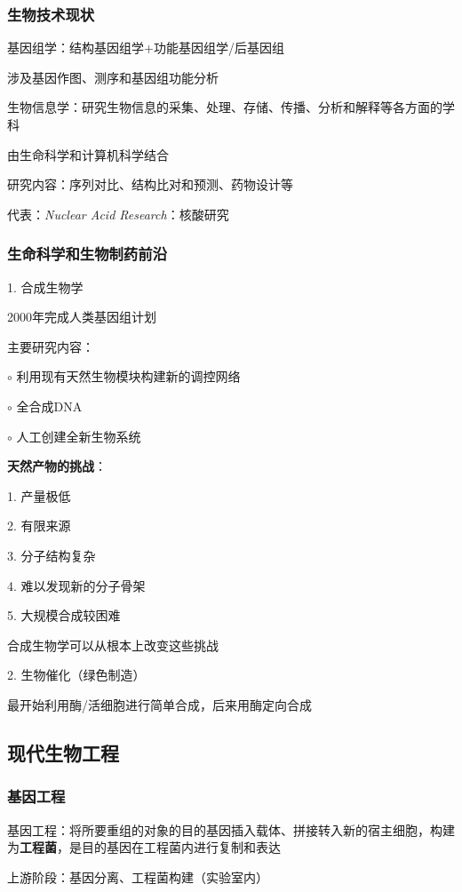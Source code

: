 \subsubsection*{生物技术现状}%
\label{subsub:生物技术现状}
\begin{notation}
    基因组学：结构基因组学+功能基因组学/后基因组

    涉及基因作图、测序和基因组功能分析
\end{notation}
\begin{notation}
    生物信息学：研究生物信息的采集、处理、存储、传播、分析和解释等各方面的学科

    由生命科学和计算机科学结合

    研究内容：序列对比、结构比对和预测、药物设计等
\end{notation}
代表：\textit{Nuclear Acid Research}：核酸研究
\subsubsection*{生命科学和生物制药前沿}%
\label{subsub:生命科学和生物制药前沿}
1. 合成生物学
\begin{notation}
    2000年完成人类基因组计划
\end{notation}
主要研究内容：

$\circ$ 利用现有天然生物模块构建新的调控网络

$\circ$ 全合成DNA

$\circ$ 人工创建全新生物系统
\begin{notation}
    \textbf{天然产物的挑战}：

    1. 产量极低

    2. 有限来源

    3. 分子结构复杂

    4. 难以发现新的分子骨架

    5. 大规模合成较困难
\end{notation}
合成生物学可以从根本上改变这些挑战

2. 生物催化（绿色制造）

最开始利用酶/活细胞进行简单合成，后来用酶定向合成
\subsection{现代生物工程}%
\label{sub:现代生物工程}
\subsubsection*{基因工程}%
\label{subsub:基因工程}
\begin{defi}
    基因工程：将所要重组的对象的目的基因插入载体、拼接转入新的宿主细胞，构建为\textbf{工程菌}，是目的基因在工程菌内进行复制和表达
\end{defi}
上游阶段：基因分离、工程菌构建（实验室内）

